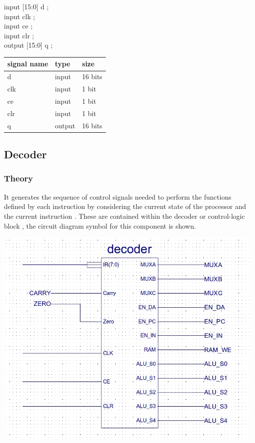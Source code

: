 \documentclass[11pt]{article}
\begin{document}
input  [15:0] d     ; \\
input         clk   ;   \\
input         ce    ; \\
input         clr   ; \\
output [15:0] q     ; \\

\begin{center}
\begin{tabular}{lll}
signal name & type & size\\
\hline
d & input & 16 bits\\
clk & input & 1 bit\\
ce & input & 1 bit\\
clr & input & 1 bit\\
q & output & 16 bits\\
\hline
\end{tabular}
\end{center}

\subsection{Decoder}
\label{sec:orged2420a}
\subsubsection{Theory}
\label{sec:org9283c64}
It generates the sequence of control signals needed to perform the functions defined by each instruction by considering the current state of the processor and the current instruction . These are contained within the decoder or control-logic block , the circuit diagram symbol for this component is shown.
\begin{center}
\includegraphics[width=.9\linewidth]{./images/decoder_sym.jpg}
\end{center}
\end{document}
